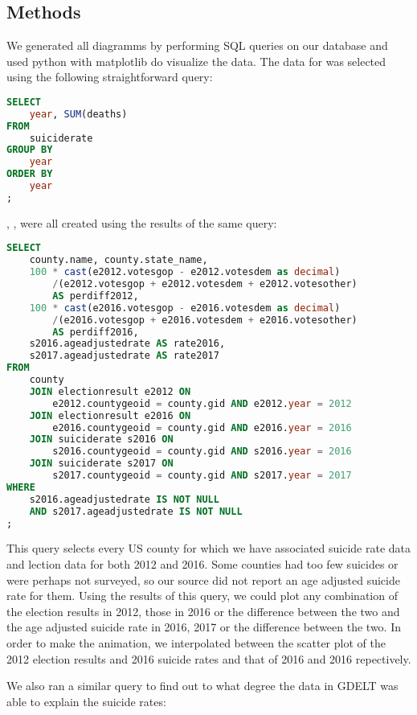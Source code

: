 \subsection{Methods}

We generated all diagramms by performing SQL queries on our database and used python with matplotlib do visualize the data.
The data for  was selected using the following straightforward query:

\begin{lstlisting}[language=SQL]
SELECT
    year, SUM(deaths)
FROM 
    suiciderate
GROUP BY
    year 
ORDER BY
    year
;
\end{lstlisting}

, ,  were all created using the results of the same query:

\begin{lstlisting}[language=SQL]
SELECT
    county.name, county.state_name,
    100 * cast(e2012.votesgop - e2012.votesdem as decimal)
        /(e2012.votesgop + e2012.votesdem + e2012.votesother) 
        AS perdiff2012,
    100 * cast(e2016.votesgop - e2016.votesdem as decimal)
        /(e2016.votesgop + e2016.votesdem + e2016.votesother) 
        AS perdiff2016,
    s2016.ageadjustedrate AS rate2016,
    s2017.ageadjustedrate AS rate2017
FROM
    county
    JOIN electionresult e2012 ON 
        e2012.countygeoid = county.gid AND e2012.year = 2012
    JOIN electionresult e2016 ON 
        e2016.countygeoid = county.gid AND e2016.year = 2016
    JOIN suiciderate s2016 ON 
        s2016.countygeoid = county.gid AND s2016.year = 2016
    JOIN suiciderate s2017 ON 
        s2017.countygeoid = county.gid AND s2017.year = 2017
WHERE
    s2016.ageadjustedrate IS NOT NULL 
    AND s2017.ageadjustedrate IS NOT NULL
;
\end{lstlisting}

This query selects every US county for which we have associated suicide rate data and lection data for both 2012 and 2016.
Some counties had too few suicides or were perhaps not surveyed, so our source did not report an age adjusted suicide rate for them.
Using the results of this query, we could plot any combination of the election results in 2012, those in 2016 or the difference between the two and the age adjusted suicide rate in 2016, 2017 or the difference between the two.
In order to make the animation, we interpolated between the scatter plot of the 2012 election results and 2016 suicide rates and that of 2016 and 2016 repectively.
\par
We also ran a similar query to find out to what degree the data in GDELT was able to explain the suicide rates:


